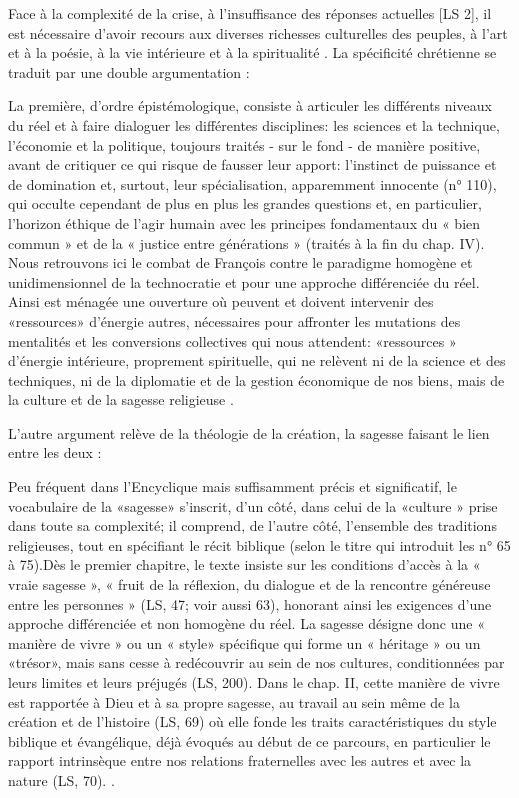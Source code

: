Face à la complexité de la crise, à l'insuffisance des réponses actuelles [LS 2], il est nécessaire d'avoir recours aux diverses richesses culturelles des peuples, à l'art et à la poésie, à la vie intérieure et à la spiritualité \cite[p. 188]{theobald_courage_2021}.
La spécificité chrétienne se traduit par une double argumentation :
\begin{singlequote}
La première, d'ordre épistémologique, consiste à articuler les différents niveaux du réel et à faire dialoguer les différentes disciplines: les sciences et la technique, l'économie et la politique, toujours traités - sur le fond - de manière positive, avant de critiquer ce qui risque de fausser leur apport: l'instinct de puissance et de domination et, surtout, leur spécialisation, apparemment innocente (n° 110), qui occulte cependant de plus en plus les grandes questions et, en particulier,
    l'horizon éthique de l'agir humain avec les principes fondamentaux du « bien commun » et de la « justice entre générations » (traités à la fin du chap. IV). Nous retrouvons ici le combat de François contre le paradigme homogène et unidimensionnel de la technocratie et pour une approche différenciée du réel. Ainsi est ménagée une ouverture où peuvent et doivent intervenir des «ressources» d'énergie autres, nécessaires pour affronter les mutations des mentalités et les conversions collectives qui nous attendent: «ressources » d'énergie intérieure, proprement spirituelle, qui ne relèvent ni de la science et des techniques, ni de la diplomatie et de la gestion économique de nos biens, mais de la culture et de la sagesse religieuse \cite[p. 189]{theobald_courage_2021}.
\end{singlequote}
L'autre argument relève de la théologie de la création, la sagesse faisant le lien entre les deux : 
\begin{singlequote}

    Peu fréquent dans l'Encyclique mais suffisamment précis et significatif, le vocabulaire de la «sagesse» s'inscrit, d'un côté, dans celui de la «culture » prise dans toute sa complexité; il comprend, de l'autre côté, l'ensemble des traditions religieuses, tout en spécifiant le récit biblique (selon le titre qui introduit les n° 65 à 75).Dès le premier chapitre, le texte insiste sur les conditions d'accès à la « vraie sagesse », « fruit de la réflexion, du dialogue et de la rencontre généreuse entre les personnes » (LS, 47; voir aussi 63), honorant ainsi les exigences d'une approche différenciée et non homogène du réel. La sagesse désigne donc une « manière de vivre » ou un « style» spécifique qui forme un « héritage » ou un «trésor», mais sans cesse à redécouvrir au sein de nos cultures, conditionnées par leurs limites et leurs préjugés (LS, 200). Dans le chap. II, cette manière de vivre est rapportée à Dieu et à sa propre sagesse, au travail au sein même de la création et de l'histoire (LS, 69) où elle fonde les traits caractéristiques du style biblique et évangélique, déjà évoqués au début de ce parcours, en particulier le rapport intrinsèque entre nos relations fraternelles avec les autres et avec la nature (LS, 70).  \cite[p. 189]{theobald_courage_2021}.
\end{singlequote}
